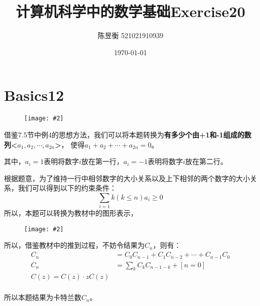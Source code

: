 \documentclass[]{article}
\title{计算机科学中的数学基础Exercise20}
\author{陈昱衡 521021910939}
\date{\today}
\newcommand{\image}[2]{\begin{figure}[H]\texttt{[image: \#2]}\end{figure}}
\begin{document}
\maketitle

\section{Basics12}
\image{0.5}{2023-05-08-17-40-51.png}
借鉴7.5节中例4的思想方法，我们可以将本题转换为\textbf{有多少个由+1和-1组成的数列<$a_1,a_2,\cdots,a_{2n}$>}，
使得$a_1+a_2+\cdots+a_{2n}=0$。\par 
其中，$a_i=1$表明将数字$i$放在第一行，$a_i=-1$表明将数字$i$放在第二行。\par
根据题意，为了维持一行中相邻数字的大小关系以及上下相邻的两个数字的大小关系，我们可以得到以下的约束条件：
\begin{equation}
    \sum_{i=1}{k(k\le n)}a_i \ge 0
\end{equation}
所以，本题可以转换为教材中的图形表示，
\image{0.4}{2023-05-10-16-53-53.png}
所以，借鉴教材中的推到过程，不妨令结果为$C_{n}$，则有：
\begin{align}
    C_{n} &= C_0C_{n-1} + C_1C_{n-2} +\cdots+C_{n-1}C_{0} \\
    C_{n} &= \sum_{k}C_kC_{n-1-k} + [n=0]\\
    C(z) = C(z) \cdot zC(z)\\
\end{align}
\par 
所以本题结果为卡特兰数$C_{n}$。
\end{document}
